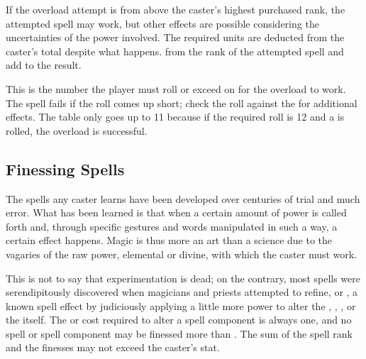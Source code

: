 \begin{multicols*}{2}
If the overload attempt is from  above the caster's highest purchased rank, the attempted spell may work, but other effects are possible considering the uncertainties of the power involved. The required units are deducted from the caster's total despite what happens.  from the rank of the attempted spell and add  to the result. 

This is the number the player must roll or exceed on  for the overload to work. The spell fails if the roll comes up short; check the roll against the  for additional effects. The table only goes up to 11 because if the required roll is 12 and a  is rolled, the overload is successful.\\



\subsection{Finessing Spells}
The spells any caster learns have been developed over centuries of trial and much error. What has been learned is that when a certain amount of power is called forth and, through specific gestures and words manipulated in such a way, a certain effect happens. Magic is thus more an art than a science due to the vagaries of the raw power, elemental or divine, with which the caster must work.

This is not to say that experimentation is dead; on the contrary, most spells were serendipitously discovered when magicians and priests attempted to refine, or , a known spell effect by judiciously applying a little more power to alter the , , , or the  itself. The \EU or \DU cost required to alter a spell component is always one, and no spell or spell component may be finessed more than . The sum of the spell rank and the finesses may not exceed the caster's \PWR stat.


\end{multicols*}
